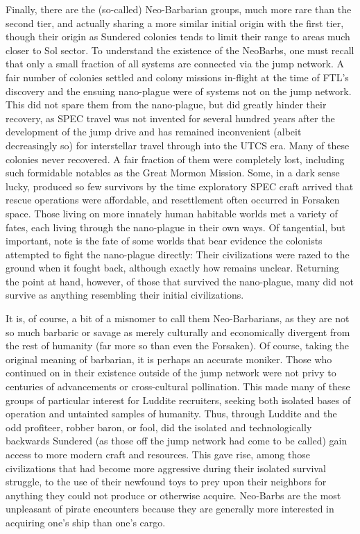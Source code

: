 Finally, there are the (so-called) Neo-Barbarian groups, much more
rare than the second tier, and actually sharing a more similar initial
origin with the first tier, though their origin as Sundered colonies
tends to limit their range to areas much closer to Sol sector. To
understand the existence of the NeoBarbs, one must recall that only a
small fraction of all systems are connected via the jump network. A
fair number of colonies settled and colony missions in-flight at the
time of FTL's discovery and the ensuing nano-plague were of systems
not on the jump network. This did not spare them from the nano-plague,
but did greatly hinder their recovery, as SPEC travel was not invented
for several hundred years after the development of the jump drive and
has remained inconvenient (albeit decreasingly so) for interstellar
travel through into the UTCS era.  Many of these colonies never
recovered. A fair fraction of them were completely lost, including
such formidable notables as the Great Mormon Mission. Some, in a dark
sense lucky, produced so few survivors by the time exploratory SPEC
craft arrived that rescue operations were affordable, and resettlement
often occurred in Forsaken space. Those living on more innately human
habitable worlds met a variety of fates, each living through the
nano-plague in their own ways. Of tangential, but important, note is
the fate of some worlds that bear evidence the colonists attempted to
fight the nano-plague directly: Their civilizations were razed to the
ground when it fought back, although exactly how remains
unclear. Returning the point at hand, however, of those that survived
the nano-plague, many did not survive as anything resembling their
initial civilizations.

It is, of course, a bit of a misnomer to call them Neo-Barbarians, as
they are not so much barbaric or savage as merely culturally and
economically divergent from the rest of humanity (far more so than
even the Forsaken). Of course, taking the original meaning of
barbarian, it is perhaps an accurate moniker. Those who continued on
in their existence outside of the jump network were not privy to
centuries of advancements or cross-cultural pollination. This made
many of these groups of particular interest for Luddite recruiters,
seeking both isolated bases of operation and untainted samples of
humanity. Thus, through Luddite and the odd profiteer, robber baron,
or fool, did the isolated and technologically backwards Sundered (as
those off the jump network had come to be called) gain access to more
modern craft and resources. This gave rise, among those civilizations
that had become more aggressive during their isolated survival
struggle, to the use of their newfound toys to prey upon their
neighbors for anything they could not produce or otherwise
acquire. Neo-Barbs are the most unpleasant of pirate encounters
because they are generally more interested in acquiring one's ship
than one's cargo.

